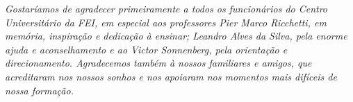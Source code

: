 \documentclass[../../layout.tex]{subfiles}
\begin{document}
\begin{dedicatoria}
\vspace*{\fill}

\noindent
\begin{flushright} 
\begin{minipage}{0.5\textwidth}
\textit{Gostaríamos de agradecer primeiramente a todos os funcionários do Centro Universitário da FEI, em especial aos professores Pier Marco Ricchetti, em memória, inspiração e dedicação à ensinar; Leandro Alves da Silva, pela enorme ajuda e aconselhamento e ao  Victor Sonnenberg, pela orientação e direcionamento. Agradecemos também à nossos familiares e amigos, que acreditaram nos nossos sonhos e nos apoiaram nos momentos mais difíceis de nossa formação.}
\end{minipage}
\end{flushright}

\end{dedicatoria}
\end{document}
